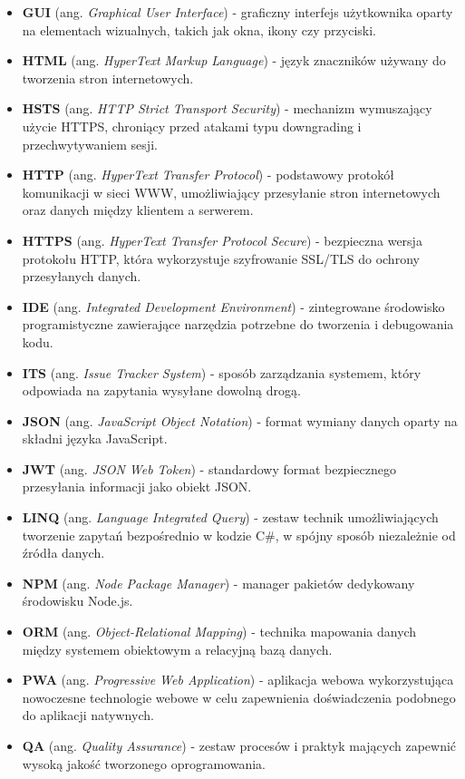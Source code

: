 \begin{itemize}
  \item \textbf{GUI} (ang. \textit{Graphical User Interface}) - graficzny interfejs użytkownika oparty na elementach wizualnych, takich jak okna, ikony czy przyciski.
  \item \textbf{HTML} (ang. \textit{HyperText Markup Language}) - język znaczników używany do tworzenia stron internetowych.
  \item \textbf{HSTS} (ang. \textit{HTTP Strict Transport Security}) - mechanizm wymuszający użycie HTTPS, chroniący przed atakami typu downgrading i przechwytywaniem sesji.
  \item \textbf{HTTP} (ang. \textit{HyperText Transfer Protocol}) - podstawowy protokół komunikacji w sieci WWW, umożliwiający przesyłanie stron internetowych oraz danych między klientem a serwerem.
  \item \textbf{HTTPS} (ang. \textit{HyperText Transfer Protocol Secure}) - bezpieczna wersja protokołu HTTP, która wykorzystuje szyfrowanie SSL/TLS do ochrony przesyłanych danych.
  \item \textbf{IDE} (ang. \textit{Integrated Development Environment}) - zintegrowane środowisko programistyczne zawierające narzędzia potrzebne do tworzenia i debugowania kodu.
  \item \textbf{ITS} (ang. \textit{Issue Tracker System}) - sposób zarządzania systemem, który odpowiada na zapytania wysyłane dowolną drogą.
  \item \textbf{JSON} (ang. \textit{JavaScript Object Notation}) - format wymiany danych oparty na składni języka JavaScript.
  \item \textbf{JWT} (ang. \textit{JSON Web Token}) - standardowy format bezpiecznego przesyłania informacji jako obiekt JSON.
  \item \textbf{LINQ} (ang. \textit{Language Integrated Query}) - zestaw technik umożliwiających tworzenie zapytań bezpośrednio w kodzie C\#, w spójny sposób niezależnie od źródła danych.
  \item \textbf{NPM} (ang. \textit{Node Package Manager}) - manager pakietów dedykowany środowisku Node.js.
  \item \textbf{ORM} (ang. \textit{Object-Relational Mapping}) - technika mapowania danych między systemem obiektowym a relacyjną bazą danych.
  \item \textbf{PWA} (ang. \textit{Progressive Web Application}) - aplikacja webowa wykorzystująca nowoczesne technologie webowe w celu zapewnienia doświadczenia podobnego do aplikacji natywnych.
  \item \textbf{QA} (ang. \textit{Quality Assurance}) - zestaw procesów i praktyk mających zapewnić wysoką jakość tworzonego oprogramowania.

\end{itemize}
